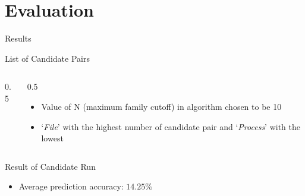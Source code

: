 \documentclass{beamer}
\begin{document}
\section{Evaluation}
\label{sec:Evaluation}
\begin{frame}[h]{Results}
  \begin{block}{List of Candidate Pairs}
\begin{columns}
  \begin{column}{{0.5\textwidth}}
\end{column}
\begin{column}{{0.5\textwidth}}
\begin{itemize}
  \item Value of N (maximum family cutoff) in algorithm chosen to be 10
  \item `\emph{File}' with the highest number of candidate pair and `\emph{Process}' with the lowest
\end{itemize}
\end{column}
\end{columns}
  \end{block}
\begin{block}{Result of Candidate Run}
\begin{itemize}
  \item Average prediction accuracy: {$14.25\%$}
\end{itemize}
\end{block}
\end{frame}
\end{document}
